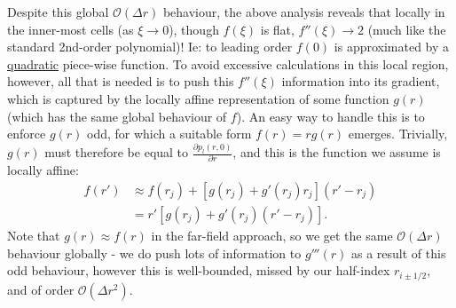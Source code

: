 \documentclass[11pt,a4paper]{article}
\begin{document}
	Despite this global $\mathcal{O}(\Delta r)$ behaviour, the above analysis reveals that locally in the inner-most cells (as $\xi \to 0$), though $f(\xi)$ is flat, $f''(\xi) \to 2$ (much like the standard 2nd-order polynomial)! Ie: to leading order $f(0)$ is approximated by a \underline{quadratic} piece-wise function. To avoid excessive calculations in this local region, however, all that is needed is to push this $f''(\xi)$ information into its gradient, which is captured by the locally affine representation of some function $g(r)$ (which has the same global behaviour of $f$). An easy way to handle this is to enforce $g(r)$ odd, for which a suitable form $f(r) = r g(r)$ emerges. Trivially, $g(r)$ must therefore be equal to $\frac{\partial p_l(r,0)}{\partial r}$, and this is the function we assume is locally affine:
	\begin{equation}
		\label{fExpansion}
		\begin{aligned}
			f(r') &\approx f(r_j) + \left[ g(r_j) +  g'(r_j)r_j \right](r'-r_j) \\
			&= r'\left[ g(r_j) + g'(r_j) (r' - r_j) \right].
		\end{aligned}
	\end{equation}
	Note that $g(r) \approx f(r)$ in the far-field approach, so we get the same $\mathcal{O}(\Delta r)$ behaviour globally - we do push lots of information to $g'''(r)$ as a result of this odd behaviour, however this is well-bounded, missed by our half-index $r_{i \pm 1/2}$, and of order $\mathcal{O}(\Delta r^2)$.
	
\end{document}
